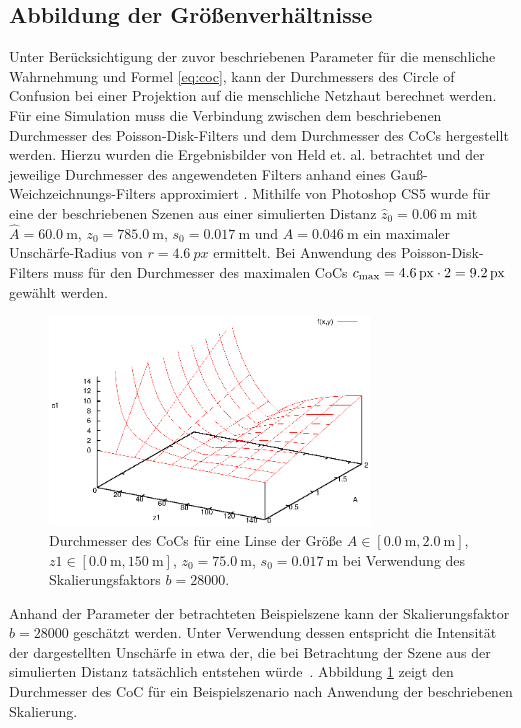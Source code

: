 \documentclass{acmsiggraph}                     %
\begin{document}
\subsection{Abbildung der Größenverhältnisse}
\label{sec:proportions}

Unter Berücksichtigung der zuvor beschriebenen Parameter für die menschliche Wahrnehmung und Formel \ref{eq:coc}, kann der Durchmessers des Circle of Confusion bei einer Projektion auf die menschliche Netzhaut berechnet werden. Für eine Simulation muss die Verbindung zwischen dem beschriebenen Durchmesser des Poisson-Disk-Filters und dem Durchmesser des CoCs hergestellt werden. Hierzu wurden die Ergebnisbilder von Held et. al. betrachtet und der jeweilige Durchmesser des angewendeten Filters anhand eines Gauß-Weichzeichnungs-Filters approximiert \cite{Held:2010cr}. Mithilfe von Photoshop CS5 wurde für eine der beschriebenen Szenen aus einer simulierten Distanz $\hat z_0 = \SI{0.06}{\meter}$ mit $\hat A = \SI{60.0}{\meter}$, $z_0 = \SI{785.0}{\meter}$, $s_0 = \SI{0.017}{\meter}$ und $A = \SI{0.046}{\meter}$ ein maximaler Unschärfe-Radius von $r = \SI{4.6}{px}$ ermittelt. Bei Anwendung des Poisson-Disk-Filters muss für den Durchmesser des maximalen CoCs $c_{\textnormal{max}} = \SI{4.6}{px} \cdot 2 = \SI{9.2}{px}$ gewählt werden.

\begin{figure}[htbp]
\centering
\includegraphics[width=3.35in]{DoF-Graph}
\caption{Durchmesser des CoCs für eine Linse der Größe $A \in [\SI{0.0}{\meter},\SI{2.0}{\meter}]$, $z1 \in [\SI{0.0}{\meter},\SI{150}{\meter}]$, $z_0 = \SI{75.0}{\meter}$, $s_0 =\SI{0.017}{\meter}$ bei Verwendung des Skalierungsfaktors $b = 28000$.}
\label{abb:cocgraph}
\end{figure}

Anhand der Parameter der betrachteten Beispielszene kann der Skalierungsfaktor $b = 28000$ geschätzt werden. Unter Verwendung dessen entspricht die Intensität der dargestellten Unschärfe in etwa der, die bei Betrachtung der Szene aus der simulierten Distanz tatsächlich entstehen würde~\cite{Held:2010cr}. Abbildung \ref{abb:cocgraph} zeigt den Durchmesser des CoC für ein Beispielszenario nach Anwendung der beschriebenen Skalierung.
\end{document}
